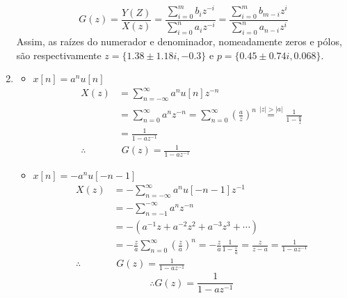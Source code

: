 \documentclass{article}
\begin{document}
\begin{enumerate}
\begin{equation}
G(z) = \frac{Y(Z)}{X(z)} = \frac{\sum_{i=0}^{m} b_{i} z^{-i}}{\sum_{i=0}^{n} a_{i} z^{-i}} = \frac{\sum_{i=0}^{m} b_{m-i} z^{i}}{\sum_{i=0}^{n} a_{n-i} z^{i}}
\end{equation}
Assim, as raízes do numerador e denominador, nomeadamente zeros e pólos, são respectivamente $z = \{1.38 \pm 1.18 i, -0.3\}$ e $p = \{0.45 \pm 0.74i, 0.068\}$.
\item %
\begin{itemize}
\item $x[n] = a^n u[n]$
\begin{equation}
\begin{split}
X(z) &= \sum_{n = -\infty}^{\infty} a^n u[n] z^{-n} \\
& = \sum_{n 
= 0}^{\infty} a^n z^{-n} = \sum_{n = 0}^{\infty} (\frac{a}{z})^n \stackrel{|z| > |a|}{=} \frac{1}{1 - \frac{a}{z}} \\
&= \frac{1}{1 - a z^{-1}} \\
\therefore & \,\, G(z) = \frac{1}{1 - a z^{-1}}
\end{split}
\end{equation}
\item $x[n] = -a^n u[-n-1]$
\begin{equation}
\begin{split}
X(z) &= - \sum_{n = - \infty}^{\infty} a^n u[-n - 1] z^{-1} \\
&= - \sum_{n = -1}^{-\infty} a^n z^{-n} \\
&= -\left(a^{-1}z + a^{-2} z^2 + a^{-3} z^3 + \cdots\right) \\
&= -\frac{z}{a} \sum_{n = 0}^{\infty} (\frac{z}{a})^n = - \frac{z}{a} \frac{1}{1 - \frac{z}{a}} = \frac{z}{z-a} = \frac{1}{1 - a z^{-1}} \\
\therefore & \,\, G(z) = \frac{1}{1 - a z^{-1}}
\end{split}
\end{equation}
\begin{equation}
\therefore G(z) = \frac{1}{1 - a z^{-1}}
\end{equation}
\end{itemize}
\end{enumerate}
\end{document}

